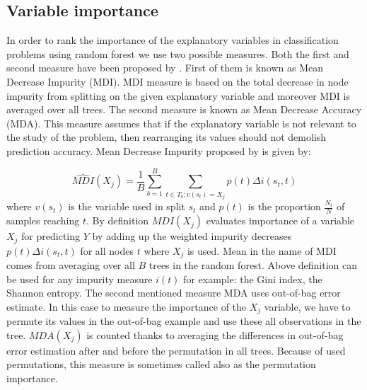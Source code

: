\subsection{Variable importance}
In order to rank the importance of the explanatory variables in classification problems using random forest 
we use two possible measures. Both the first and second measure have been proposed by \cite{breiman2001random}. 
First of them is known as Mean Decrease Impurity (MDI). MDI measure is based on the total decrease in node impurity from splitting 
on the given explanatory variable and moreover MDI is averaged over all trees. 
The second measure is known as Mean Decrease Accuracy (MDA). 
This measure assumes that if the explanatory variable is not relevant to the study of the problem, 
then rearranging its values should not demolish prediction accuracy. Mean Decrease Impurity proposed 
by \cite{breiman2001random} is given by: 

\begin{equation}
	\widehat{MDI}( X_{j} ) = \frac{1}{B} \displaystyle \sum_{b=1}^{B}  \displaystyle\sum_{t \in T_{b}: v(s_{t}) =  X_{j}  } p(t)\Delta i(s_{t}, t)
\end{equation}
where $ v(s_{t}) $ is the variable used in split $s_{t}$ and $ p(t) $ is the proportion $\frac{N_{t}}{N}$ of samples reaching $t$.
By definition $ MDI( X_{j} ) $ evaluates importance of a variable $ X_{j} $ for predicting $Y$ by 
adding up the weighted impurity decreases $p(t) \Delta i(s_{t}, t)$ for all nodes $t$ where $ X_{j}$ is used. 
Mean in the name of MDI comes from averaging over all $B$ trees in the random forest. 
Above definition can be used for any impurity measure $i(t)$ for example: the Gini index, the Shannon entropy. 
The second mentioned measure MDA uses out-of-bag error estimate. 
In this case to measure the importance of the $X_{j}$ variable, we have to permute its values in the out-of-bag example and 
use these all observations in the tree. $ MDA( X_{j} )$ is counted thanks to averaging the differences in 
out-of-bag error estimation after and before the permutation in all trees. Because of used permutations, 
this measure is sometimes called also as the permutation importance.


